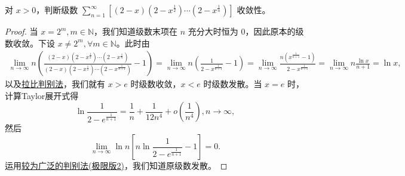\documentclass[../../main.tex]{subfiles}
\begin{document}
\begin{example}
对 \( x > 0 \)，判断级数 \( \sum_{n = 1}^{\infty} \left[ (2 - x) \left( 2 - x^{\frac{1}{2}} \right) \cdots \left( 2 - x^{\frac{1}{n}} \right) \right] \) 收敛性。
\end{example}
\begin{proof}
当 \( x = 2^m, m \in \mathbb{N} \)，我们知道级数末项在 \( n \) 充分大时恒为 0，因此原本的级数收敛。下设 \( x \neq 2^m, \forall m \in \mathbb{N} \)。此时由
\begin{align*}
\lim_{n \to \infty} n \left( \frac{(2 - x) \left( 2 - x^{\frac{1}{2}} \right) \cdots \left( 2 - x^{\frac{1}{n}} \right)}{(2 - x) \left( 2 - x^{\frac{1}{2}} \right) \cdots \left( 2 - x^{\frac{1}{n + 1}} \right)} - 1 \right) = \lim_{n \to \infty} n \left( \frac{1}{2 - x^{\frac{1}{n + 1}}} - 1 \right)= \lim_{n \to \infty} \frac{n \left( x^{\frac{1}{n + 1}} - 1 \right)}{2 - x^{\frac{1}{n + 1}}} = \lim_{n \to \infty} n \frac{\ln x}{n + 1} = \ln x,
\end{align*}
以及\hyperref[theorem:拉比判别法]{拉比判别法}，我们就有 \( x > e \) 时级数收敛，\( x < e \) 时级数发散。当 \( x = e \) 时，计算Taylor展开式得
\[
\ln \frac{1}{2 - e^{\frac{1}{n + 1}}} = \frac{1}{n} + \frac{1}{12 n^4} + o \left( \frac{1}{n^4} \right), n \to \infty,
\]
然后
\[
\lim_{n \to \infty} \ln n \left[ n \ln \frac{1}{2 - e^{\frac{1}{n + 1}}} - 1 \right] = 0.
\]
运用\hyperref[theorem:较为广泛的判别法]{较为广泛的判别法(极限版2)}，我们知道原级数发散。

\end{proof}
\end{document}
